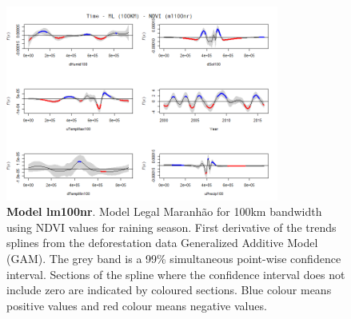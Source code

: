 \begin{table}

\begin{figure}[H]
 \centering
        \centering
        \includegraphics[width=0.8\textwidth]{ml100nr.png} %
        \caption[Model Legal Maranhão for 100km bandwidth using NDVI values for raining season. First derivative of the trends splines from the deforestation data Generalized Additive Model (GAM)]{\textbf{Model lm100nr}. Model Legal Maranhão for 100km bandwidth using NDVI values for raining season. First derivative of the trends splines from the deforestation data Generalized Additive Model (GAM). The grey band is a 99\% simultaneous point-wise confidence interval. Sections of the spline where the confidence interval does not include zero are indicated by coloured sections. Blue colour means positive values and red colour means negative values.}
        \centering
\end{figure}
\end{table}

